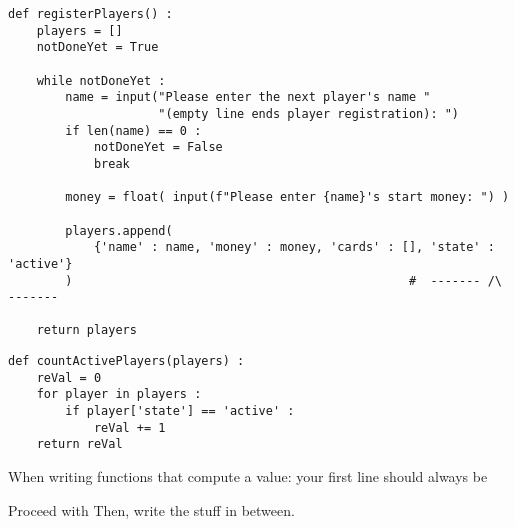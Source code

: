 
\begin{frame}[fragile]
%
\begin{codebox}
\begin{verbatim}
def registerPlayers() :
    players = []
    notDoneYet = True
    
    while notDoneYet :
        name = input("Please enter the next player's name "
                     "(empty line ends player registration): ")
        if len(name) == 0 :
            notDoneYet = False
            break
        
        money = float( input(f"Please enter {name}'s start money: ") )
        
        players.append(
            {'name' : name, 'money' : money, 'cards' : [], 'state' : 'active'}
        )                                               #  ------- /\ -------
    
    return players
\end{verbatim}
\end{codebox}
%
\end{frame}


\begin{frame}[fragile]
%
\begin{codebox}
\begin{verbatim}
def countActivePlayers(players) :
    reVal = 0
    for player in players :
        if player['state'] == 'active' :
            reVal += 1
    return reVal
\end{verbatim}
\end{codebox}
%
\begin{hintbox}
\small
When writing functions that compute a value: your first line should always be

\vspace{6pt}
Proceed with
Then, write the stuff in between.
\end{hintbox}
%
\end{frame}


